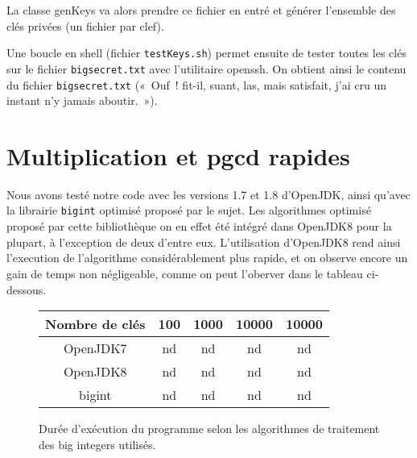 \documentclass[a4paper,10pt]{article}
\begin{document}
  La classe genKeys va alors prendre ce fichier en entré et générer l'ensemble des clés privées (un fichier par clef).
  
  Une boucle en shell (fichier \texttt{testKeys.sh}) permet ensuite de tester toutes les clés sur le fichier \texttt{bigsecret.txt} avec l'utilitaire openssh. On obtient ainsi le contenu du fichier \texttt{bigsecret.txt} («~Ouf~! fit-il, suant, las, mais satisfait, j'ai cru un instant n'y jamais aboutir.~»).

\section{Multiplication et pgcd rapides}
  Nous avons testé notre code avec les versions 1.7 et 1.8 d'OpenJDK, ainsi qu'avec la librairie \texttt{bigint} optimisé proposé par le sujet. Les algorithmes optimisé proposé par cette bibliothèque on en effet été intégré dans OpenJDK8 pour la plupart, à l'exception de deux d'entre eux.
  L'utilisation d'OpenJDK8 rend ainsi l'execution de l'algorithme considérablement plus rapide, et on observe encore un gain de temps non négligeable, comme on peut l'oberver dans le tableau ci-dessous.
  
  \begin{figure}[b]
  \begin{center}
  \begin{tabular}{|c|c|c|c|c|}
   \hline
   Nombre de clés & 100 & 1000 & 10000 & 10000\\
   \hline
   OpenJDK7 & nd & nd & nd & nd\\
   \hline
   OpenJDK8 & nd & nd & nd & nd\\
   \hline
   bigint & nd & nd & nd & nd\\
   \hline
  \end{tabular}
  \caption{Durée d'exécution du programme selon les algorithmes de traitement des big integers utilisés.}
  \end{center}
  \end{figure}




  
\end{document}
